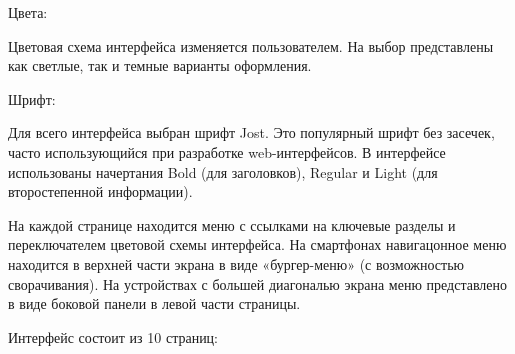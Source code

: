 \documentclass[project.tex]{subfiles}
\begin{document}
\par
Цвета:
\par
Цветовая схема интерфейса изменяется пользователем. На выбор представлены как светлые, так и темные варианты оформления.
\par
Шрифт:
\par
Для всего интерфейса выбран шрифт Jost. Это популярный шрифт без засечек, часто использующийся при разработке web-интерфейсов. В интерфейсе использованы начертания Bold (для заголовков), Regular и Light (для второстепенной информации).
\par
На каждой странице находится меню с ссылками на ключевые разделы и переключателем цветовой схемы интерфейса. На смартфонах навигацонное меню находится в верхней части экрана в виде «бургер-меню» (с возможностью сворачивания).
На устройствах с большей диагональю экрана меню представлено в виде боковой панели в левой части страницы.
\par
\vspace{0.5cm}
Интерфейс состоит из 10 страниц:
\end{document}
